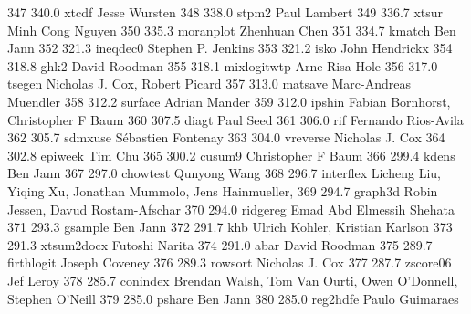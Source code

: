    347    340.0    xtcdf         Jesse Wursten                           
   348    338.0    stpm2         Paul Lambert                            
   349    336.7    xtsur         Minh Cong Nguyen                        
   350    335.3    moranplot     Zhenhuan Chen                           
   351    334.7    kmatch        Ben Jann                                
   352    321.3    ineqdec0      Stephen P. Jenkins                      
   353    321.2    isko          John Hendrickx                          
   354    318.8    ghk2          David Roodman                           
   355    318.1    mixlogitwtp   Arne Risa Hole                          
   356    317.0    tsegen        Nicholas J. Cox, Robert Picard          
   357    313.0    matsave       Marc-Andreas Muendler                   
   358    312.2    surface       Adrian Mander                           
   359    312.0    ipshin        Fabian Bornhorst, Christopher F Baum    
   360    307.5    diagt         Paul Seed                               
   361    306.0    rif           Fernando Rios-Avila                     
   362    305.7    sdmxuse       Sébastien Fontenay                     
   363    304.0    vreverse      Nicholas J. Cox                         
   364    302.8    epiweek       Tim Chu                                 
   365    300.2    cusum9        Christopher F Baum                      
   366    299.4    kdens         Ben Jann                                
   367    297.0    chowtest      Qunyong Wang                            
   368    296.7    interflex     Licheng Liu, Yiqing Xu, Jonathan        
                                   Mummolo, Jens Hainmueller,              
   369    294.7    graph3d       Robin Jessen, Davud Rostam-Afschar      
   370    294.0    ridgereg      Emad Abd Elmessih Shehata               
   371    293.3    gsample       Ben Jann                                
   372    291.7    khb           Ulrich Kohler, Kristian Karlson         
   373    291.3    xtsum2docx    Futoshi Narita                          
   374    291.0    abar          David Roodman                           
   375    289.7    firthlogit    Joseph Coveney                          
   376    289.3    rowsort       Nicholas J. Cox                         
   377    287.7    zscore06      Jef Leroy                               
   378    285.7    conindex      Brendan Walsh, Tom Van Ourti, Owen      
                                   O'Donnell, Stephen O'Neill              
   379    285.0    pshare        Ben Jann                                
   380    285.0    reg2hdfe      Paulo Guimaraes                         
